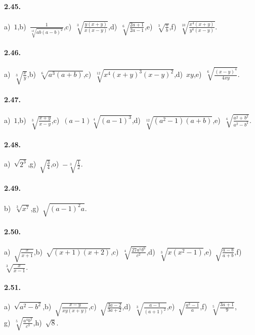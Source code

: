 \paragraph{2.45.}
a)~$1$,\quad b)~$\frac{1}{\sqrt[12]{ab(a-b)^2}}$,\quad c)~$\sqrt[3]{\frac{y(x+y)}{x(x-y)}}$,\quad d)~$\sqrt[6]{\frac{2a+1}{2a-1}}$,\quad e)~$\sqrt[3]{\frac{a}{b}}$,\quad f)~$\sqrt[10]{\frac{x^4(x+y)}{y^4(x-y)}}$.

\paragraph{2.46.}
a)~$\sqrt[3]{\frac{x}{y}}$,\quad b)~$\sqrt[6]{a^3(a+b)}$,\quad c)~$\sqrt[12]{x^4(x+y)^3(x-y)^2}$,\quad d)~$xy$,\quad e)~$\sqrt[6]{\frac{(x-y)^4}{4xy}}$. %

\paragraph{2.47.}
a)~$1$,\quad b)~$\sqrt[3]{\frac{x+y}{x-y}}$,\quad c)~$(a-1)\sqrt[4]{(a-1)^3}$,\quad d)~$\sqrt[12]{(a^2-1)(a+b)}$,\quad e)~$\sqrt[4]{\frac{a^2+b^2}{a^2-b^2}}$. %

\paragraph{2.48.}
a)~$\sqrt{2^3}$,\quad g)~$\sqrt{\frac 3 4}$,\quad o)~$-\sqrt[3]{\frac 1 2}$.

\paragraph{2.49.}
b)~$\sqrt[3]{x^7}$,\quad g)~$\sqrt{(a-1)^2a}$.

\paragraph{2.50.}
a)~$\sqrt{\frac{x}{x+1}}$,\quad b)~$\sqrt{(x+1)(x+2)}$,\quad c)~$\sqrt[4]{\frac{27a^5b^6}{c^2}}$,\quad d)~$\sqrt[3]{x(x^2-1)}$,\quad e)~$\sqrt{\frac{a-b}{a+b}}$,\quad f)~$\sqrt[3]{\frac{x}{x-1}}$.

\paragraph{2.51.}
a)~$\sqrt{a^2-b^2}$,\quad b)~$\sqrt{\frac{x-y}{xy(x+y)}}$,\quad c)~$\sqrt{\frac{3a-2}{3a+2}}$,\quad d)~$\sqrt[3]{\frac{a-1}{(a+1)^2}}$,\quad e)~$\sqrt{\frac{a^2-1}{a}}$,\quad f)~$\sqrt[5]{\frac{3a+1}{9}}$,\protect\\
\quad g)~$\sqrt[5]{\frac{a^4b^2}{c^3}}$,\quad h)~$\sqrt{8}$.


